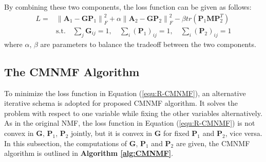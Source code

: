 \documentclass{bmcart}
\begin{document}
By combining these two components, the loss function can be given as follows:
\begin{equation}\label{equ:R-CMNMF}
\begin{split}
{L} =& \left\| \bm{A}_1 - \bm{G{P}}_1 \right\|_F^2 + \alpha \left\| {\bm{A}_2} - \bm{GP}_2 \right\|_F^2-\beta tr({\bm{P}_1}\bm{MP}_2^T)\\
&\mathrm{s.t. }\quad \sum_j\bm{G}_{ij}=1,\quad \sum_i{(\bm{P}_1)}_{ij}=1,\quad \sum_i{(\bm{P}_2)}_{ij}=1
\end{split}
\end{equation}
where $\alpha$, $\beta$ are parameters to balance the tradeoff between the two components.

\subsection*{\textbf{The CMNMF Algorithm}}
To minimize the loss function in Equation (\ref{equ:R-CMNMF}), an alternative iterative schema is adopted for proposed CMNMF algorithm. It solves the problem with respect to one variable while fixing the other variables alternatively. As in the original NMF, the loss function in Equation (\ref{equ:R-CMNMF}) is not convex in $\bm{G}$, $\bm{P}_1$, $\bm{P}_2$ jointly, but it is convex in $\bm{G}$ for fixed $\bm{P}_1$ and $\bm{P}_2$, vice versa. In this subsection, the computations of $\bm{G}$, $\bm{P}_1$ and $\bm{P}_2$ are given, the CMNMF algorithm is outlined in \textbf{Algorithm \ref{alg:CMNMF}}.
\end{document}
